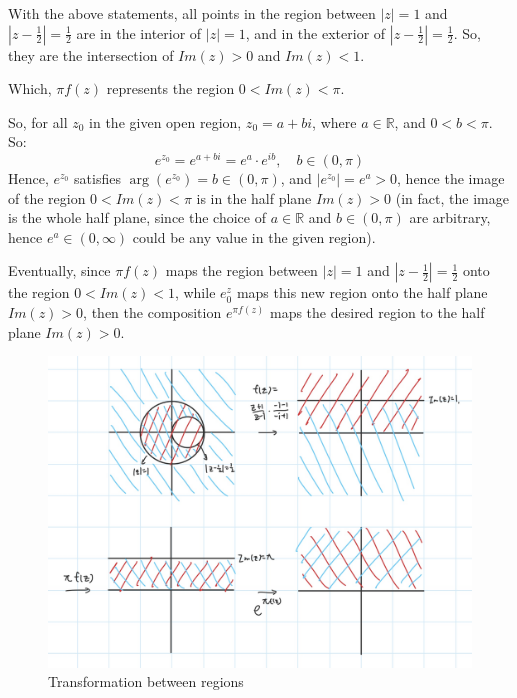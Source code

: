 \documentclass{article}
\begin{document}
\hfill

With the above statements, all points in the region between $|z|=1$ and $|z-\frac{1}{2}|=\frac{1}{2}$ are in the interior of $|z|=1$, and in the exterior of $|z-\frac{1}{2}|=\frac{1}{2}$.
So, they are the intersection of $Im(z)>0$ and $Im(z)<1$.

Which, $\pi f(z)$ represents the region $0<Im(z)<\pi$.

So, for all $z_0$ in the given open region, $z_0=a+bi$, where $a\in \mathbb{R}$, and $0<b<\pi$. So:
$$e^{z_0}=e^{a+bi}=e^a\cdot e^{ib},\quad b\in (0,\pi)$$
Hence, $e^{z_0}$ satisfies $\arg(e^{z_0})=b\in (0,\pi)$, and $|e^{z_0}|=e^a>0$, hence the image of the region $0<Im(z)<\pi$ is in the half plane $Im(z)>0$
(in fact, the image is the whole half plane, since the choice of $a\in \mathbb{R}$ and $b\in (0,\pi)$ are arbitrary, hence $e^a\in (0,\infty)$ could be any value in the given region).

\hfill

Eventually, since $\pi f(z)$ maps the region between $|z|=1$ and $|z-\frac{1}{2}|=\frac{1}{2}$ onto the region $0<Im(z)<1$,
while $e^z_0$ maps this new region onto the half plane $Im(z)>0$, then the composition $e^{\pi f(z)}$ maps the desired region to the half plane $Im(z)>0$.

\hfill

\begin{figure}[h!]
    \begin{center}
        \includegraphics*[width=150mm]{moon to half plane.jpg}
        \caption{Transformation between regions}
    \end{center}
\end{figure}
\end{document}
